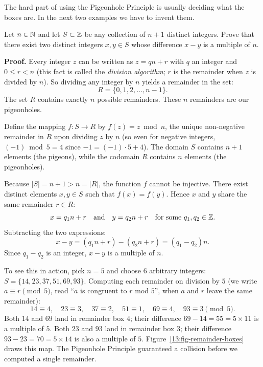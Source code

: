 The hard part of using the Pigeonhole Principle is usually deciding what the boxes are. In the next two examples we have to invent them.

\begin{example}
Let $n \in \mathbb{N}$ and let $S \subset \mathbb{Z}$ be any collection of $n+1$ distinct integers. Prove that there exist two distinct integers $x, y \in S$ whose difference $x - y$ is a multiple of $n$.

\textbf{Proof.}
Every integer $z$ can be written as $z = qn + r$ with $q$ an integer and $0 \le r < n$ (this fact is called the \emph{division algorithm}; $r$ is the remainder when $z$ is divided by $n$). So dividing any integer by $n$ yields a remainder in the set:
\[
R = \{0, 1, 2, \dots, n-1\}.
\]
The set $R$ contains exactly $n$ possible remainders. These $n$ remainders are our pigeonholes.

Define the mapping $f: S \to R$ by $f(z) = z \bmod n$, the unique non-negative remainder in $R$ upon dividing $z$ by $n$ (so even for negative integers, $(-1) \bmod 5 = 4$ since $-1 = (-1)\cdot 5 + 4$). The domain $S$ contains $n+1$ elements (the pigeons), while the codomain $R$ contains $n$ elements (the pigeonholes). 

Because $|S| = n + 1 > n = |R|$, the function $f$ cannot be injective. There exist distinct elements $x, y \in S$ such that $f(x) = f(y)$. Hence $x$ and $y$ share the same remainder $r \in R$:
\[
x = q_1 n + r \quad \text{and} \quad y = q_2 n + r \quad \text{for some } q_1, q_2 \in \mathbb{Z}.
\]
Subtracting the two expressions:
\[
x - y = (q_1 n + r) - (q_2 n + r) = (q_1 - q_2)n.
\]
Since $q_1 - q_2$ is an integer, $x - y$ is a multiple of $n$. 

To see this in action, pick $n = 5$ and choose $6$ arbitrary integers: $S = \{14, 23, 37, 51, 69, 93\}$. Computing each remainder on division by $5$ (we write $a \equiv r \pmod 5$, read ``$a$ is congruent to $r$ mod $5$'', when $a$ and $r$ leave the same remainder):
\[
14 \equiv 4, \quad 23 \equiv 3, \quad 37 \equiv 2, \quad 51 \equiv 1, \quad 69 \equiv 4, \quad 93 \equiv 3 \pmod 5.
\]
Both $14$ and $69$ land in remainder box $4$; their difference $69 - 14 = 55 = 5 \times 11$ is a multiple of $5$. Both $23$ and $93$ land in remainder box $3$; their difference $93 - 23 = 70 = 5 \times 14$ is also a multiple of $5$. Figure~\ref{13:fig-remainder-boxes} draws this map. The Pigeonhole Principle guaranteed a collision before we computed a single remainder.
\end{example}

